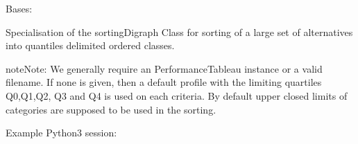 \documentclass[letterpaper,10pt,english]{sphinxmanual}
\begin{document}
\begin{fulllineitems}
\label{techDoc:sortingDigraphs.QuantilesSortingDigraph}
Bases: {\hyperref[techDoc:sortingDigraphs.SortingDigraph]{\emph{}}}

Specialisation of the sortingDigraph Class
for sorting of a large set of alternatives into
quantiles delimited ordered classes.

\begin{notice}{note}{Note:}
We generally require an PerformanceTableau instance or a valid filename.
If none is given, then a default profile with the limiting quartiles Q0,Q1,Q2, Q3 and Q4 is used on each criteria.
By default upper closed limits of categories are supposed to be used in the sorting.
\end{notice}

Example Python3 session:


\end{fulllineitems}
\end{document}

